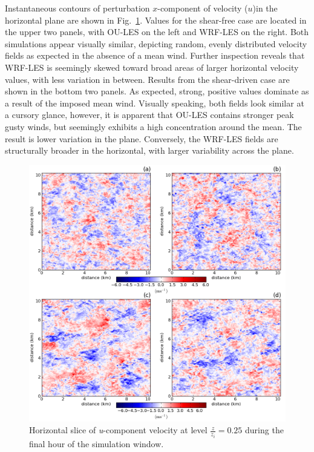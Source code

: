 Instantaneous contours of perturbation $x$-component of velocity ($u$)in the horizontal plane are shown in Fig.~\ref{figure502}. Values for the shear-free case are located in the upper two panels, with OU-LES on the left and WRF-LES on the right. Both simulations appear visually similar, depicting random, evenly distributed velocity fields as expected in the absence of a mean wind. Further inspection reveals that WRF-LES is seemingly skewed toward broad areas of larger horizontal velocity values, with less variation in between. Results from the shear-driven case are shown in the bottom two panels. As expected, strong, positive values dominate as a result of the imposed mean wind. Visually speaking, both fields look similar at a cursory glance, however, it is apparent that OU-LES contains stronger peak gusty winds, but seemingly exhibits a high concentration around the mean. The result is lower variation in the plane. Conversely, the WRF-LES fields are structurally broader in the horizontal, with larger variability across the plane.


\begin{figure}[!ht]
\begin{center}
\includegraphics[width=\textwidth]{figures/chapter5/u_slice}
\end{center}
\caption{Horizontal slice of \textit{u}-component velocity at level $\frac{z}{z_i} = 0.25$ during the final hour of the simulation window.}
\label{figure502}
\end{figure}


